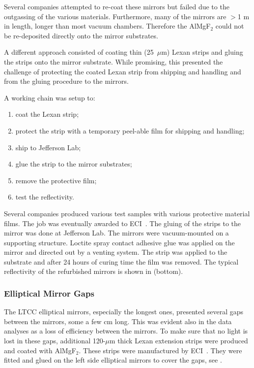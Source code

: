Several companies attempted to re-coat these mirrors but failed due to the outgassing of the various materials.
Furthermore, many of the mirrors are $>$1 m in length, longer than most vacuum chambers. Therefore the AlMgF$_2$
could not be re-deposited directly onto the mirror substrates.

A different approach consisted of coating thin (25~$\mu$m) Lexan strips and gluing the strips onto the mirror
substrate. While promising, this presented the challenge of protecting the coated Lexan strip from shipping and
handling and from the gluing procedure to the mirrors.

A working chain was setup to:

\begin{enumerate}
	\item coat the Lexan strip;
	\item protect the strip with a temporary peel-able film for shipping and handling;
	\item ship to Jefferson Lab;
	\item glue the strip to the mirror substrates;
	\item remove the protective film;
	\item test the reflectivity.
\end{enumerate}

Several companies produced various test samples with various protective material films. The job was eventually awarded
to ECI~\cite{ECI}. The gluing of the strips to the mirror was done at Jefferson Lab. The mirrors were vacuum-mounted
on a supporting structure. Loctite spray contact adhesive glue was applied on the mirror and directed out by a venting
system. The strip was applied to the substrate and after 24 hours of curing time the film was removed. The typical
reflectivity of the refurbished mirrors is shown in  (bottom).

\subsubsection{Elliptical Mirror Gaps}

The LTCC elliptical mirrors, especially the longest ones, presented several gaps between the mirrors, some a few
cm long. This was evident also in the data analyses as a loss of efficiency between the mirrors. To make sure that
no light is lost in these gaps, additional 120-$\mu$m thick Lexan extension strips were produced and coated with
AlMgF$_2$. These strips were manufactured by ECI~\cite{ECI}. They were fitted and glued on the left side
elliptical mirrors to cover the gaps, see .

